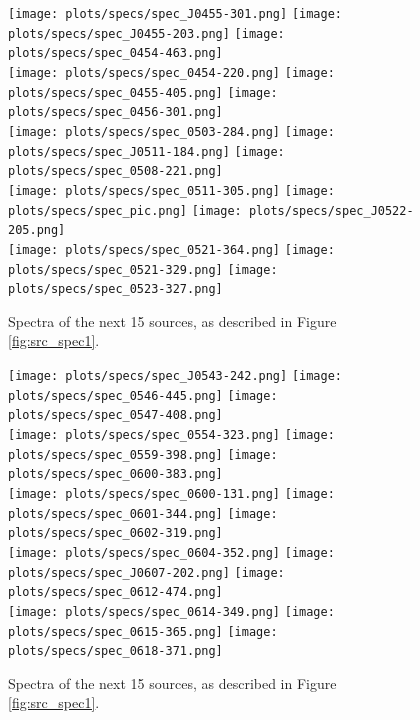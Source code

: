 \documentclass[preprint]{aastex}
\begin{document}
\begin{figure}\centering
\texttt{[image: plots/specs/spec\_J0455-301.png]}
\texttt{[image: plots/specs/spec\_J0455-203.png]}
\texttt{[image: plots/specs/spec\_0454-463.png]}\\
\texttt{[image: plots/specs/spec\_0454-220.png]}
\texttt{[image: plots/specs/spec\_0455-405.png]}
\texttt{[image: plots/specs/spec\_0456-301.png]}\\
\texttt{[image: plots/specs/spec\_0503-284.png]}
\texttt{[image: plots/specs/spec\_J0511-184.png]}
\texttt{[image: plots/specs/spec\_0508-221.png]}\\
\texttt{[image: plots/specs/spec\_0511-305.png]}
\texttt{[image: plots/specs/spec\_pic.png]}
\texttt{[image: plots/specs/spec\_J0522-205.png]}\\
\texttt{[image: plots/specs/spec\_0521-364.png]}
\texttt{[image: plots/specs/spec\_0521-329.png]}
\texttt{[image: plots/specs/spec\_0523-327.png]}\\
\caption{Spectra of the next 15 sources, as described in Figure \ref{fig:src_spec1}.
}\label{fig:src_spec10}
\end{figure}\clearpage

\begin{figure}\centering
\texttt{[image: plots/specs/spec\_J0543-242.png]}
\texttt{[image: plots/specs/spec\_0546-445.png]}
\texttt{[image: plots/specs/spec\_0547-408.png]}\\
\texttt{[image: plots/specs/spec\_0554-323.png]}
\texttt{[image: plots/specs/spec\_0559-398.png]}
\texttt{[image: plots/specs/spec\_0600-383.png]}\\
\texttt{[image: plots/specs/spec\_0600-131.png]}
\texttt{[image: plots/specs/spec\_0601-344.png]}
\texttt{[image: plots/specs/spec\_0602-319.png]}\\
\texttt{[image: plots/specs/spec\_0604-352.png]}
\texttt{[image: plots/specs/spec\_J0607-202.png]}
\texttt{[image: plots/specs/spec\_0612-474.png]}\\
\texttt{[image: plots/specs/spec\_0614-349.png]}
\texttt{[image: plots/specs/spec\_0615-365.png]}
\texttt{[image: plots/specs/spec\_0618-371.png]}\\
\caption{Spectra of the next 15 sources, as described in Figure \ref{fig:src_spec1}.
}\label{fig:src_spec11}
\end{figure}\clearpage
\end{document}
